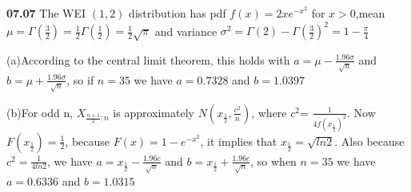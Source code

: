 {\bf 07.07}
The WEI $(1,2)$ distribution has pdf $f(x)=2xe^{-x^2}$ for $x>0$,mean $\mu=\Gamma(\frac{3}{2})=\frac{1}{2}\Gamma(\frac{1}{2})=\frac{1}{2}\sqrt{\pi}$
and variance $\sigma^2=\Gamma(2)-\Gamma(\frac{3}{2})^2=1-\frac{\pi}{4}$

(a)According to the central limit theorem, this holds with $a=\mu-\frac{1.96\sigma}{\sqrt{n}}$ and $b=\mu+\frac{1.96\sigma}{\sqrt{n}}$, so if $n=35$ we have $a=0.7328$
and $b=1.0397$

(b)For odd n, $X_{\frac{n+1}{2}:n}$ is approximately $N(x_{\frac{1}{2}},\frac{c^2}{n})$, where $c^2$=%
$\frac{1}{4f(x_\frac{1}{2})^2}$. Now $F(x_{\frac{1}{2}})=\frac{1}{2}$, because $F(x)=1-e^{-x^2}$, it implies that $x_\frac{1}{2}=\sqrt{ln2}$. Also because
$c^2=\frac{1}{4ln2}$, we have $a=x_{\frac{1}{2}}-\frac{1.96c}{\sqrt{n}}$ and $b=x_{\frac{1}{2}}+\frac{1.96c}{\sqrt{n}}$, so when $n=35$ we have $a=0.6336$ and
$b=1.0315$